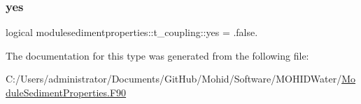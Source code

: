 \subsubsection{\texorpdfstring{yes}{yes}}
{\footnotesize\ttfamily logical modulesedimentproperties\+::t\+\_\+coupling\+::yes = .false.\hspace{0.3cm}{\ttfamily [private]}}



The documentation for this type was generated from the following file\+:\begin{DoxyCompactItemize}
\item 
C\+:/\+Users/administrator/\+Documents/\+Git\+Hub/\+Mohid/\+Software/\+M\+O\+H\+I\+D\+Water/\mbox{\hyperlink{_module_sediment_properties_8_f90}{Module\+Sediment\+Properties.\+F90}}\end{DoxyCompactItemize}
